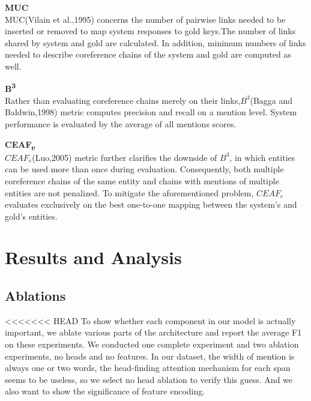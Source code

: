 \documentclass[11pt]{article}
\begin{document}
\textbf{MUC}\\
MUC(Vilain et al.,1995) concerns the number of pairwise links needed to be inserted or removed to map system responses to gold keys.The number of links shared by  system and gold are calculated. In addition, minimum numbers of links needed to describe coreference chains of the system and gold are computed as well.

\textbf{B\textsuperscript{3}} \\
Rather than evaluating coreference chains merely on their links,$B^{3}$(Bagga and Baldwin,1998) metric computes precision and recall on a mention level. System performance is evaluated by the average of all mentions scores.


\textbf{CEAF\textsubscript{e}} \\
$CEAF_e$(Luo,2005) metric further clarifies the downside of $B^{3}$, in which entities  can be used more than once during evaluation. Consequently, both multiple coreference chains of the same entity and chains with mentions of multiple entities are not penalized. To mitigate the aforementioned problem, $CEAF_e$ evaluates exclusively on the best one-to-one mapping between the system’s and gold’s entities.


\section{Results and Analysis}
\subsection{Ablations}
<<<<<<< HEAD
To show whether each component in our model is actually important, we ablate various parts of the architecture and report the average F1 on these experiments. We conducted one complete experiment and two ablation experiments, no heads and no features. In our dataset, the width of mention is always one or two words, the head-finding attention mechanism for each span seems to be useless, so we select no head ablation to verify this guess.  And we also want to show the significance of feature encoding.
\end{document}
